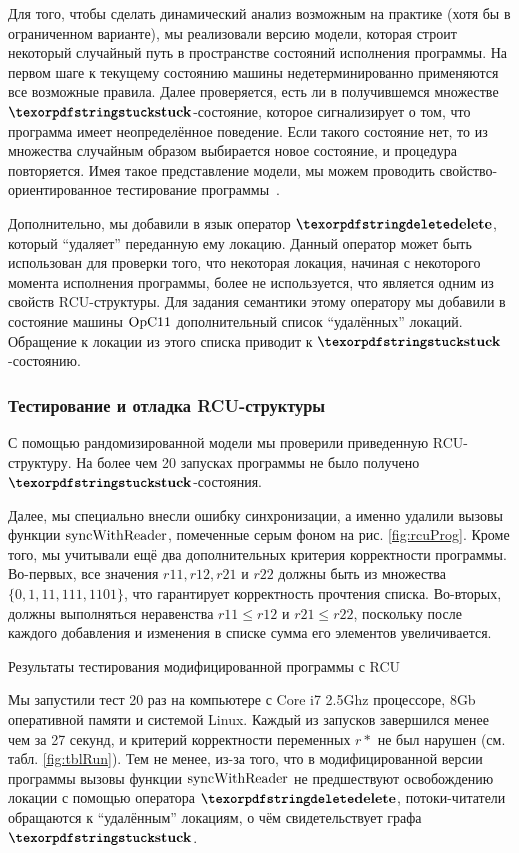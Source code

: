 Для того, чтобы сделать динамический анализ возможным на практике (хотя бы в ограниченном варианте),
мы реализовали версию модели, которая строит некоторый случайный путь в пространстве состояний исполнения программы.
На первом шаге к текущему состоянию машины недетерминированно применяются все возможные правила.
Далее проверяется, есть ли в получившемся множестве $\kw{stuck}$-состояние, которое сигнализирует о том, что
программа имеет неопределённое поведение. Если такого состояние нет, то из множества случайным образом выбирается
новое состояние, и процедура повторяется.
Имея такое представление модели, мы можем проводить свойство-ориентированное тестирование программы~\cite{Hritcu-al:ICFP13}.

Дополнительно, мы добавили в язык оператор $\kw{delete}$, который ``удаляет'' переданную ему локацию.
Данный оператор может быть использован для проверки того, что некоторая локация, начиная с некоторого момента исполнения программы,
более не используется, что является одним из свойств RCU-структуры.
Для задания семантики этому оператору мы добавили в состояние машины $\mathrm{OpC11}$ дополнительный список ``удалённых'' локаций.
Обращение к локации из этого списка приводит к $\kw{stuck}$-состоянию.

\subsubsection{Тестирование и отладка RCU-структуры}
С помощью рандомизированной модели мы проверили приведенную RCU-структуру.
На более чем 20 запусках программы не было получено $\kw{stuck}$-состояния.

Далее, мы специально внесли ошибку синхронизации, а именно удалили вызовы функции ${\rm syncWithReader}$,
помеченные серым фоном на рис. \ref{fig:rcuProg}.
Кроме того, мы учитывали ещё два дополнительных критерия корректности программы.
Во-первых, все значения $r11, r12, r21$ и $r22$ должны быть из множества $\{0, 1, 11, 111, 1101\}$,
что гарантирует корректность прочтения списка.
Во-вторых, должны выполняться неравенства $r11 \le r12$ и $r21 \le r22$, поскольку после каждого добавления и
изменения в списке сумма его элементов увеличивается.

\begin{table}
\centering
  
\caption{Результаты тестирования модифицированной программы с RCU}
\label{fig:tblRun}
\end{table}

Мы запустили тест 20 раз на компьютере с Core i7 2.5Ghz процессоре, 8Gb оперативной памяти и системой Linux.
Каждый из запусков завершился менее чем за 27 секунд, и критерий корректности переменных $r*$ не был нарушен
(см. табл. \ref{fig:tblRun}). Тем не менее, из-за того, что в модифицированной версии программы
вызовы функции ${\rm syncWithReader}$ не предшествуют освобождению
локации с помощью оператора $\kw{delete}$, потоки-читатели
обращаются к ``удалённым'' локациям, о чём свидетельствует графа $\kw{stuck}$.

